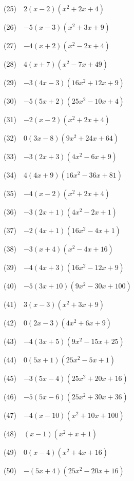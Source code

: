 \documentclass[a4j,twocolumn,10pt,fleqn]{jarticle}
\begin{document}
(25)~~$2\left(x - 2\right) \left(x^{2} + 2 x + 4\right)$

(26)~~$-5\left(x - 3\right) \left(x^{2} + 3 x + 9\right)$

(27)~~$-4\left(x + 2\right) \left(x^{2} - 2 x + 4\right)$

(28)~~$4\left(x + 7\right) \left(x^{2} - 7 x + 49\right)$

(29)~~$-3\left(4 x - 3\right) \left(16 x^{2} + 12 x + 9\right)$

(30)~~$-5\left(5 x + 2\right) \left(25 x^{2} - 10 x + 4\right)$

(31)~~$-2\left(x - 2\right) \left(x^{2} + 2 x + 4\right)$

(32)~~$0\left(3 x - 8\right) \left(9 x^{2} + 24 x + 64\right)$

(33)~~$-3\left(2 x + 3\right) \left(4 x^{2} - 6 x + 9\right)$

(34)~~$4\left(4 x + 9\right) \left(16 x^{2} - 36 x + 81\right)$

(35)~~$-4\left(x - 2\right) \left(x^{2} + 2 x + 4\right)$

(36)~~$-3\left(2 x + 1\right) \left(4 x^{2} - 2 x + 1\right)$

(37)~~$-2\left(4 x + 1\right) \left(16 x^{2} - 4 x + 1\right)$

(38)~~$-3\left(x + 4\right) \left(x^{2} - 4 x + 16\right)$

(39)~~$-4\left(4 x + 3\right) \left(16 x^{2} - 12 x + 9\right)$

(40)~~$-5\left(3 x + 10\right) \left(9 x^{2} - 30 x + 100\right)$

(41)~~$3\left(x - 3\right) \left(x^{2} + 3 x + 9\right)$

(42)~~$0\left(2 x - 3\right) \left(4 x^{2} + 6 x + 9\right)$

(43)~~$-4\left(3 x + 5\right) \left(9 x^{2} - 15 x + 25\right)$

(44)~~$0\left(5 x + 1\right) \left(25 x^{2} - 5 x + 1\right)$

(45)~~$-3\left(5 x - 4\right) \left(25 x^{2} + 20 x + 16\right)$

(46)~~$-5\left(5 x - 6\right) \left(25 x^{2} + 30 x + 36\right)$

(47)~~$-4\left(x - 10\right) \left(x^{2} + 10 x + 100\right)$

(48)~~$\left(x - 1\right) \left(x^{2} + x + 1\right)$

(49)~~$0\left(x - 4\right) \left(x^{2} + 4 x + 16\right)$

(50)~~$-\left(5 x + 4\right) \left(25 x^{2} - 20 x + 16\right)$
\end{document}
